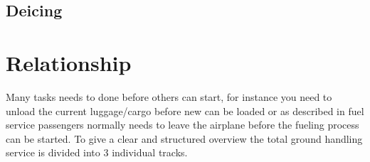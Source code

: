 \subsection{Deicing}

\section{Relationship}
Many tasks needs to done before others can start, for instance you need to unload the current luggage/cargo before new can be loaded or as described in fuel service passengers normally needs to leave the airplane before the fueling process can be started. To give a clear and structured overview the total ground handling service is divided into 3 individual tracks.